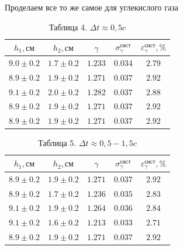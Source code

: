 \documentclass[a4paper]{article}
\begin{document}
Проделаем все то же самое для углекислого газа
\clearpage
\begin{table}[h!]
    \centering
    \begin{tabular}{|c|c|c|c|c|}
        \hline
        $h_1, \text{см}$ & $h_2, \text{см}$ & $\gamma$ & $\sigma_\gamma^{\text{сист}}$ & $\varepsilon_\gamma^{\text{сист}}, \%$ \\
        \hline
        $9.0 \pm 0.2$ & $1.7 \pm 0.2$ & $1.233$ & $0.034$ & $2.79$ \\ \hline
        $8.9 \pm 0.2$ & $1.9 \pm 0.2$ & $1.271$ & $0.037$ & $2.92$ \\ \hline
        $9.1 \pm 0.2$ & $2.0 \pm 0.2$ & $1.282$ & $0.037$ & $2.88$ \\ \hline
        $8.9 \pm 0.2$ & $1.9 \pm 0.2$ & $1.271$ & $0.037$ & $2.92$ \\ \hline
        $8.9 \pm 0.2$ & $1.9 \pm 0.2$ & $1.271$ & $0.037$ & $2.92$ \\ \hline
    \end{tabular}
    \caption{Таблица 4. $\Delta t \approx 0,5 c$}
\end{table}

\begin{table}[h!]
    \centering
    \begin{tabular}{|c|c|c|c|c|}
        \hline
        $h_1, \text{см}$ & $h_2, \text{см}$ & $\gamma$ & $\sigma_\gamma^{\text{сист}}$ & $\varepsilon_\gamma^{\text{сист}}, \%$ \\
        \hline
        $8.9 \pm 0.2$ & $1.9 \pm 0.2$ & $1.271$ & $0.037$ & $2.92$ \\ \hline
        $8.9 \pm 0.2$ & $1.7 \pm 0.2$ & $1.236$ & $0.035$ & $2.83$ \\ \hline
        $9.1 \pm 0.2$ & $1.9 \pm 0.2$ & $1.264$ & $0.036$ & $2.84$ \\ \hline
        $9.1 \pm 0.2$ & $1.6 \pm 0.2$ & $1.213$ & $0.033$ & $2.71$ \\ \hline
        $8.9 \pm 0.2$ & $1.9 \pm 0.2$ & $1.271$ & $0.037$ & $2.92$ \\ \hline
    \end{tabular}
    \caption{Таблица 5. $\Delta t \approx 0,5-1,5c$}
\end{table}
\end{document}
